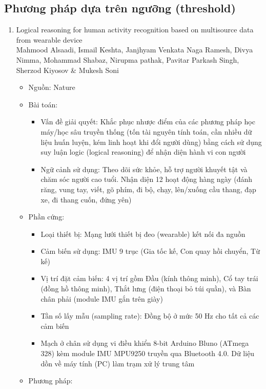 \documentclass[../DoAn.tex]{subfiles}
\begin{document}
\subsection{Phương pháp dựa trên ngưỡng (threshold)}
\begin{enumerate}[label=\arabic*)]
\item Logical reasoning for human activity recognition based on multisource data from wearable device \\
    Mahmood Alsaadi, Ismail Keshta, Janjhyam Venkata Naga Ramesh, Divya Nimma, Mohammad Shabaz, Nirupma pathak, Pavitar Parkash Singh, Sherzod Kiyosov & Mukesh Soni 
    \begin{itemize}
        \item Nguồn: Nature
        \item Bài toán:
        \begin{itemize}
            \item Vấn đề giải quyết: Khắc phục nhược điểm của các phương pháp học máy/học sâu truyền thống (tốn tài nguyên tính toán, cần nhiều dữ liệu huấn luyện, kém linh hoạt khi đổi người dùng) bằng cách sử dụng suy luận logic (logical reasoning) để nhận diện hành vi con người
            \item Ngữ cảnh sử dụng: Theo dõi sức khỏe, hỗ trợ người khuyết tật và chăm sóc người cao tuổi. Nhận diện 12 hoạt động hàng ngày (đánh răng, vung tay, viết, gõ phím, đi bộ, chạy, lên/xuống cầu thang, đạp xe, đi thang cuốn, đứng yên)
        \end{itemize}
        \item Phần cứng:
        \begin{itemize}
            \item Loại thiết bị: Mạng lưới thiết bị đeo (wearable) kết nối đa nguồn
            \item Cảm biến sử dụng: IMU 9 trục (Gia tốc kế, Con quay hồi chuyển, Từ kế)
            \item Vị trí đặt cảm biến: 4 vị trí gồm Đầu (kính thông minh), Cổ tay trái (đồng hồ thông minh), Thắt lưng (điện thoại bỏ túi quần), và Bàn chân phải (module IMU gắn trên giày)
            \item Tần số lấy mẫu (sampling rate): Đồng bộ ở mức 50 Hz cho tất cả các cảm biến
            \item Mạch ở chân sử dụng vi điều khiển 8-bit Arduino Bluno (ATmega 328) kèm module IMU MPU9250 truyền qua Bluetooth 4.0. Dữ liệu dồn về máy tính (PC) làm trạm xử lý trung tâm
        \end{itemize}
        \item Phương pháp:

\end{itemize}
\end{enumerate}
\end{document}
